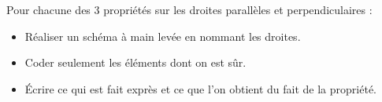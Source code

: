 \exo{}

Pour chacune des 3 propriétés sur les droites parallèles et perpendiculaires : 

\begin{itemize}
	\item Réaliser un schéma à main levée en nommant les droites.
	\item Coder seulement les éléments dont on est sûr.
	\item Écrire ce qui est fait exprès et ce que l'on obtient du fait de la propriété.

\end{itemize} 